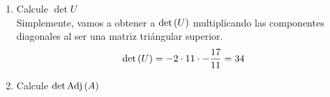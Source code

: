 \begin{enumerate}[label=\listAlph]
        \item Calcule \(\det U\) \\
            Simplemente, vamos a obtener a \(\text{det} \left( U \right)\) multiplicando las componentes diagonales al ser una matriz triángular superior.
            \[
                \text{det} \left( U \right) =
                -2 \cdot 11 \cdot -\frac{17}{11} =
                34
            \]
        \item Calcule \(\det \text{Adj}\left(A\right)\) \\
    \end{enumerate}
